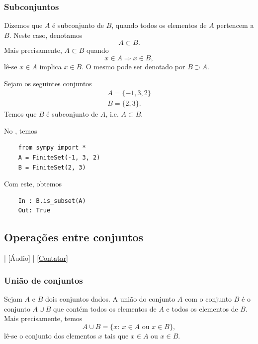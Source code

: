 \subsubsection{Subconjuntos}

Dizemos que $A$ é subconjunto de $B$, quando todos os elementos de $A$ pertencem a $B$. Neste caso, denotamos
\begin{equation}
  A \subset B.
\end{equation}
Mais precisamente, $A\subset B$ quando
\begin{equation}
  x\in A \Rightarrow x\in B,
\end{equation}
lê-se $x\in A$ implica $x\in B$. O mesmo pode ser denotado por $B\supset A$.

\begin{ex}
  Sejam os seguintes conjuntos
  \begin{gather}
    A = \{-1, 3, 2\}\\
    B = \{2, 3\}.
  \end{gather}
  Temos que $B$ é subconjunto de $A$, i.e. $A\subset B$.
    
  \ifispython
  No \python, temos
  \begin{lstlisting}
    from sympy import *
    A = FiniteSet(-1, 3, 2)
    B = FiniteSet(2, 3)
  \end{lstlisting}
  Com este, obtemos
  \begin{lstlisting}
    In : B.is_subset(A)
    Out: True
  \end{lstlisting}
  \fi
\end{ex}

\subsection{Operações entre conjuntos}

\begin{flushright}
  [Vídeo] | [Áudio] | \href{https://phkonzen.github.io/notas/contato.html}{[Contatar]}
\end{flushright}

\subsubsection{União de conjuntos}

Sejam $A$ e $B$ dois conjuntos dados. A união do conjunto $A$ com o conjunto $B$ é o conjunto $A\cup B$ que contém todos os elementos de $A$ e todos os elementos de $B$. Mais precisamente, temos
\begin{equation}
  A\cup B = \{x:~x\in A \text{ ou } x\in B\},
\end{equation}
lê-se o conjunto dos elementos $x$ tais que $x\in A$ ou $x\in B$.

